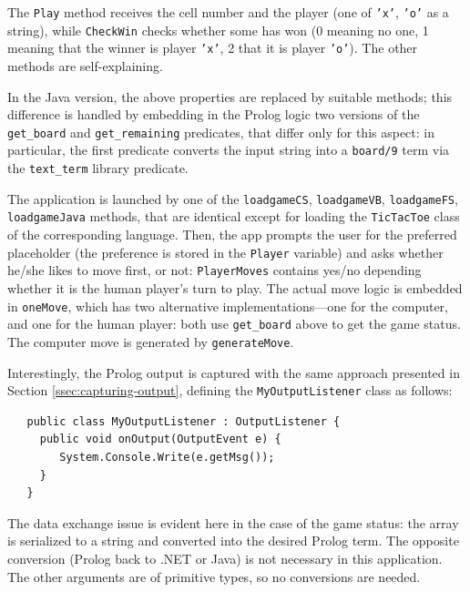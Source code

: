 The \texttt{Play} method receives the cell number and the player (one of \texttt{'x'}, \texttt{'o'} as a string), while \texttt{CheckWin} checks whether some has won (0 meaning no one, 1 meaning that the winner is player \texttt{'x'}, 2 that it is player \texttt{'o'}).
The other methods are self-explaining.

In the Java version, the above properties are replaced by suitable methods; this difference is handled by embedding in the Prolog logic two versions of the \texttt{get\_board} and \texttt{get\_remaining} predicates, that differ only for this aspect: in particular, the first predicate converts the input string into a \texttt{board/9} term via the \texttt{text\_term} library predicate.

The application is launched by one of the \texttt{loadgameCS}, \texttt{loadgameVB}, \texttt{loadgameFS}, \texttt{loadgameJava} methods, that are identical except for loading the \texttt{TicTacToe} class of the corresponding language.
%
Then, the app prompts the user for the preferred placeholder (the preference is stored in the \texttt{Player} variable) and asks whether he/she likes to move first, or not: \texttt{PlayerMoves} contains yes/no depending whether it is the human player's turn to play.
%
The actual move logic is embedded in \texttt{oneMove}, which has two alternative implementations---one for the computer, and one for the human player: both use \texttt{get\_board} above to get the game status. The computer move is generated by \texttt{generateMove}.

Interestingly, the Prolog output is captured with the same approach presented in Section \ref{ssec:capturing-output}, defining the \texttt{MyOutputListener} class as follows:

\begin{verbatim}
   public class MyOutputListener : OutputListener {
     public void onOutput(OutputEvent e) {
        System.Console.Write(e.getMsg());
     }
   }
\end{verbatim}

\noindent The data exchange issue is evident here in the case of the game status: the array is serialized to a string and converted into the desired Prolog term. The opposite conversion (Prolog back to .NET or Java) is not necessary in this application.
The other arguments are of primitive types, so no conversions are needed.

